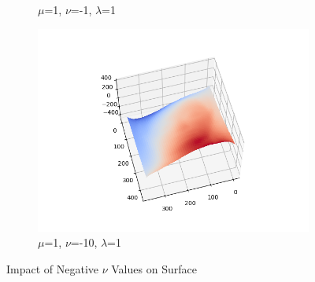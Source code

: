 \documentclass{article}
\begin{document}
\begin{figure}[H]
\begin{subfigure}{0.32\textwidth}
		\caption{$\mu$=1, $\nu$=-1, $\lambda$=1}
	\end{subfigure}
	\hfill
	\begin{subfigure}{0.32\textwidth}
		\centering
		\includegraphics[width=\textwidth]{./src/2f_v_change/faceCalibrated_mu_1_v_-10_lambda_1.png}
		\caption{$\mu$=1, $\nu$=-10, $\lambda$=1}
	\end{subfigure}
	
	\caption{Impact of Negative $\nu$ Values on Surface}
	\label{fig:v_n_ul}
\end{figure}
	
\end{document}
